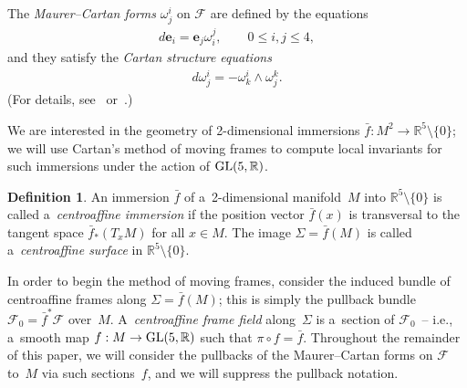 \documentclass[pdftex]{sigma}
\numberwithin{equation}{section}
\theoremstyle{definition}
\newtheorem{dfn}[teo]{Definition}
\begin{document}
The {\em Maurer--Cartan forms} $\omega^i_j$ on $\mathcal{F}$ are def\/ined by the equations
\begin{gather}
d\mathbf{e}_{i} = \mathbf{e}_{j}  \omega^{j}_{i},
\qquad
0 \leq i,j \leq 4,
\label{define-MC-forms}
\end{gather}
and they satisfy the {\em Cartan structure equations}
\begin{gather}
d\omega^i_j = -\omega^i_k \wedge \omega^k_j.
\label{structure-eqns}
\end{gather}
(For details, see~\cite[p.~18]{CFB} or~\cite{FTC}.)

We are interested in the geometry of 2-dimensional immersions $\bar{f}:M^2 \to \mathbb{R}^5 \setminus \{0\}$; we will
use Cartan's method of moving frames to compute local invariants for such immersions under the action of ${\rm
GL}(5,\mathbb{R})$.

\begin{dfn}
\label{centroaffine-immersion-def}
An immersion $\bar{f}$ of a~2-dimensional manifold~$M$ into $\mathbb{R}^5 \setminus \{0\}$ is called a~{\em centroaffine
immersion} if the position vector $\bar{f}(x)$ is transversal to the tangent space $\bar{f}_*(T_xM)$ for all $x\in M$.
The image $\Sigma = \bar{f}(M)$ is called a~{\em centroaffine surface} in $\mathbb{R}^5 \setminus \{0\}$.
\end{dfn}

In order to begin the method of moving frames, consider the induced bundle of centroaf\/f\/ine frames along $\Sigma =
\bar{f}(M)$; this is simply the pullback bundle $\mathcal{F}_0 = \bar{f}^*\mathcal{F}$ over~$M$.
A~{\em centroaffine frame field} along~$\Sigma$ is a~section of $\mathcal{F}_0$~-- i.e., a~smooth map $f:M \to {\rm
GL}(5,\mathbb{R})$ such that $\pi \circ f = \bar{f}$. Throughout the remainder of this paper, we will consider the
pullbacks of the Maurer--Cartan forms on $\mathcal{F}$ to~$M$ via such sections~$f$, and we will suppress the pullback
notation.
\end{document}
